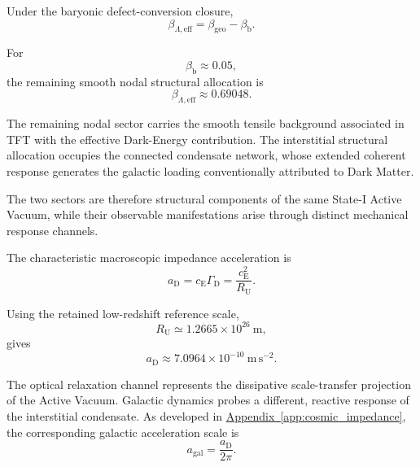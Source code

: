 Under the baryonic defect-conversion closure,
\begin{equation}
    \beta_{\Lambda,\mathrm{eff}}
    =
    \beta_{\mathrm{geo}}
    -
    \beta_{\mathrm b}.
\end{equation}

For
\begin{equation}
    \beta_{\mathrm b}
    \approx
    0.05,
\end{equation}
the remaining smooth nodal structural allocation is
\begin{equation}
    \beta_{\Lambda,\mathrm{eff}}
    \approx
    0.69048.
\end{equation}

The remaining nodal sector carries the smooth tensile background associated in TFT with the effective Dark-Energy contribution. The interstitial structural allocation occupies the connected condensate network, whose extended coherent response generates the galactic loading conventionally attributed to Dark Matter.

The two sectors are therefore structural components of the same State-I Active Vacuum, while their observable manifestations arise through distinct mechanical response channels.

The characteristic macroscopic impedance acceleration is
\begin{equation}
    a_{\mathrm D}
    =
    c_{\mathrm E}\Gamma_{\mathrm D}
    =
    \frac{c_{\mathrm E}^2}{R_{\mathrm U}}.
\end{equation}

Using the retained low-redshift reference scale,
\begin{equation}
    R_{\mathrm U}
    \simeq
    1.2665\times10^{26}\ \mathrm{m},
\end{equation}
gives
\begin{equation}
    a_{\mathrm D}
    \approx
    7.0964\times10^{-10}\ \mathrm{m\,s^{-2}}.
\end{equation}

The optical relaxation channel represents the dissipative scale-transfer projection of the Active Vacuum. Galactic dynamics probes a different, reactive response of the interstitial condensate. As developed in
\hyperref[app:cosmic_impedance]{Appendix~\ref*{app:cosmic_impedance}},
the corresponding galactic acceleration scale is
\begin{equation}
    a_{\mathrm{gal}}
    =
    \frac{a_{\mathrm D}}{2\pi}.
\end{equation}

